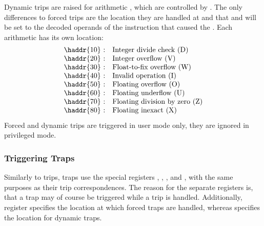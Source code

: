 Dynamic trips are raised for arithmetic , which are controlled by . The only differences to forced trips are the location they are handled at and that  and  will be set to the decoded operands of the instruction that caused the . Each arithmetic  has its own location:
$$\vbox{\halign{\hfil#:\quad &#\hfil\cr
	\haddr{10} & Integer divide check (D)\cr
	\haddr{20} & Integer overflow (V)\cr
	\haddr{30} & Float-to-fix overflow (W)\cr
	\haddr{40} & Invalid operation (I)\cr
	\haddr{50} & Floating overflow (O)\cr
	\haddr{60} & Floating underflow (U)\cr
	\haddr{70} & Floating division by zero (Z)\cr
	\haddr{80} & Floating inexact (X)\cr
}}$$
Forced and dynamic trips are triggered in user mode only, \ie they are ignored in privileged mode. \citep[pg. 28]{mmix-doc}

\subsubsection{Triggering Traps}

Similarly to trips, traps use the special registers , , ,  and , with the same purposes as their trip correspondences. The reason for the separate registers is, that a trap may of course be triggered while a trip is handled. Additionally, register  specifies the location at which forced traps are handled, whereas  specifies the location for dynamic traps. \citep[pg. 28,29]{mmix-doc}

